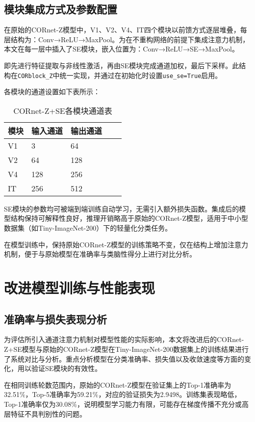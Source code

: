\subsection{模块集成方式及参数配置}

在原始的CORnet-Z模型中，V1、V2、V4、IT四个模块以前馈方式逐层堆叠，每层结构为：Conv→ReLU→MaxPool。为在不重构网络的前提下集成注意力机制，本文在每一层中插入了SE模块，嵌入位置为：Conv→ReLU→SE→MaxPool。

即先进行特征提取与非线性激活，再由SE模块完成通道加权，最后下采样。此结构在\texttt{CORblock\_Z}中统一实现，并通过在初始化时设置\texttt{use\_se=True}启用。

各模块的通道设置如下表所示：

\begin{table}[htb]
	\centering
	\caption{CORnet-Z+SE各模块通道表}
	\label{tab:CORnet-Z+SE各模块通道表}
	\begin{tabular}{lllll}
		\hline
		模块& 输入通道 & 输出通道 \\
		\hline
		V1 & 3 & 64   \\
		V2 & 64 & 128   \\
		V4 & 128 & 256   \\
		IT & 256 & 512    \\
		\hline
	\end{tabular}
\end{table}

SE模块的参数均可被端到端训练自动学习，无需引入额外损失函数。集成后的模型结构保持可解释性良好，推理开销略高于原始的CORnet-Z模型，适用于中小型数据集（如Tiny-ImageNet-200）下的轻量化分类任务。

在模型训练中，保持原始CORnet-Z模型的训练策略不变，仅在结构上增加注意力机制，便于与原始模型在准确率与类脑性得分上进行对比分析。

\section{改进模型训练与性能表现}

\subsection{准确率与损失表现分析}

为评估所引入通道注意力机制对模型性能的实际影响，本文将改进后的CORnet-Z+SE模型与原始的CORnet-Z模型在Tiny-ImageNet-200数据集上的训练结果进行了系统对比与分析。重点分析模型在分类准确率、损失值以及收敛速度等方面的变化，用以验证SE模块的有效性。

在相同训练轮数范围内，原始的CORnet-Z模型在验证集上的Top-1准确率为32.51\%，Top-5准确率为59.21\%，对应的验证损失为2.9498。训练集表现略低，Top-1准确率仅为30.08\%，说明模型学习能力有限，可能存在梯度传播不充分或高层特征不具判别性的问题。

